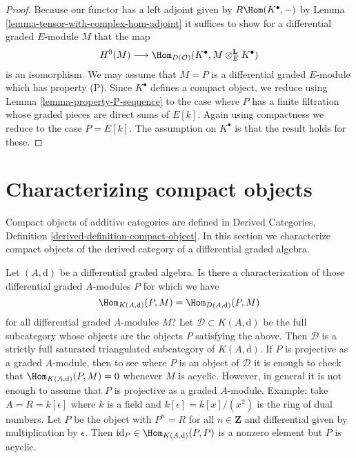 \begin{proof}
Because our functor has a left adjoint given by
$R\Hom(K^\bullet, -)$ by Lemma \ref{lemma-tensor-with-complex-hom-adjoint}
it suffices to show for a differential graded $E$-module $M$ that the map
$$
H^0(M) \longrightarrow
\Hom_{D(\mathcal{O})}(K^\bullet, M \otimes_E^\mathbf{L} K^\bullet)
$$
is an isomorphism. We may assume that $M = P$ is a differential graded
$E$-module which has property (P). Since $K^\bullet$ defines a
compact object, we reduce using
Lemma \ref{lemma-property-P-sequence}
to the case where $P$ has a finite filtration whose graded pieces
are direct sums of $E[k]$. Again using compactness we reduce
to the case $P = E[k]$. The assumption on $K^\bullet$ is that
the result holds for these.
\end{proof}











\section{Characterizing compact objects}
\label{section-compact}

\noindent
Compact objects of additive categories are defined in
Derived Categories, Definition \ref{derived-definition-compact-object}.
In this section we characterize compact objects of the derived
category of a differential graded algebra.

\begin{remark}
\label{remark-source-graded-projective}
Let $(A, \text{d})$ be a differential graded algebra. Is there a
characterization of those differential graded $A$-modules $P$
for which we have
$$
\Hom_{K(A, \text{d})}(P, M) =  \Hom_{D(A, \text{d})}(P, M)
$$
for all differential graded $A$-modules $M$? Let
$\mathcal{D} \subset K(A, \text{d})$ be the full subcategory
whose objects are the objects $P$ satisfying the above. Then $\mathcal{D}$
is a strictly full saturated triangulated subcategory of $K(A, \text{d})$.
If $P$ is projective as a graded $A$-module, then to see where $P$
is an object of $\mathcal{D}$ it is enough to check that
$\Hom_{K(A, \text{d})}(P, M) = 0$ whenever $M$ is acyclic.
However, in general it is not enough to assume that $P$ is projective as
a graded $A$-module. Example: take $A = R = k[\epsilon]$ where $k$ is
a field and $k[\epsilon] = k[x]/(x^2)$ is the ring of dual numbers.
Let $P$ be the object with $P^n = R$ for all $n \in \mathbf{Z}$
and differential given by multiplication by $\epsilon$. Then
$\text{id}_P \in \Hom_{K(A, \text{d})}(P, P)$ is a nonzero element
but $P$ is acyclic.
\end{remark}


